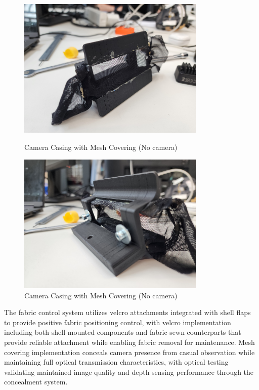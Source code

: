 \begin{figure}[H]
    \centering
    \begin{minipage}{0.45\textwidth}
        \centering
        \includegraphics[width=0.8\textwidth]{Images/CameraCasingMesh.jpg}
        \caption{Camera Casing with Mesh Covering (No camera)} 
        \label{fig:camera_casing_mesh}
    \end{minipage}
    \hfill
    \begin{minipage}{0.45\textwidth}
        \centering
        \includegraphics[width=0.8\textwidth]{Images/CameraCasingMesh (2).jpg}
        \caption{Camera Casing with Mesh Covering (No camera)}
        \label{fig:camera_casing_mesh_back}
    \end{minipage}
\end{figure}

The fabric control system utilizes velcro attachments integrated with shell flaps to provide positive fabric positioning control, with velcro implementation including both shell-mounted components and fabric-sewn counterparts that provide reliable attachment while enabling fabric removal for maintenance. Mesh covering implementation conceals camera presence from casual observation while maintaining full optical transmission characteristics, with optical testing validating maintained image quality and depth sensing performance through the concealment system.


